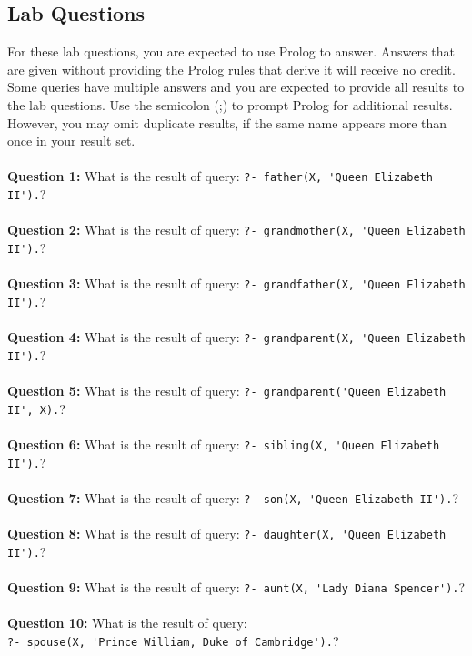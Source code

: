 \documentclass{article}
\begin{document}
\begin{tcolorbox}
 \section*{Lab Questions}
 For these lab questions, you are expected to use Prolog to answer. Answers that are given without providing the Prolog rules that derive it will receive no credit. Some queries have multiple answers and you are expected to provide all results to the lab questions. Use the semicolon (;) to prompt Prolog for additional results. However, you may omit duplicate results, if the same name appears more than once in your result set.
 \\\\
 \noindent \textbf{Question 1:} What is the result of query: \verb|?- father(X, 'Queen Elizabeth II').|?
 \\\\
 \noindent \textbf{Question 2:} What is the result of query: \verb|?- grandmother(X, 'Queen Elizabeth II').|?
 \\\\
 \noindent \textbf{Question 3:} What is the result of query: \verb|?- grandfather(X, 'Queen Elizabeth II').|?
 \\\\
 \noindent \textbf{Question 4:} What is the result of query: \verb|?- grandparent(X, 'Queen Elizabeth II').|?
 \\\\
 \noindent \textbf{Question 5:} What is the result of query: \verb|?- grandparent('Queen Elizabeth II', X).|?
 \\\\
 \noindent \textbf{Question 6:} What is the result of query: \verb|?- sibling(X, 'Queen Elizabeth II').|?
 \\\\
 \noindent \textbf{Question 7:} What is the result of query: \verb|?- son(X, 'Queen Elizabeth II').|?
 \\\\
 \noindent \textbf{Question 8:} What is the result of query: \verb|?- daughter(X, 'Queen Elizabeth II').|?
 \\\\
 \noindent \textbf{Question 9:} What is the result of query: \verb|?- aunt(X, 'Lady Diana Spencer').|?
 \\\\
 \noindent \textbf{Question 10:} What is the result of query:\\\verb|?- spouse(X, 'Prince William, Duke of Cambridge').|?

\end{tcolorbox}
\end{document}
